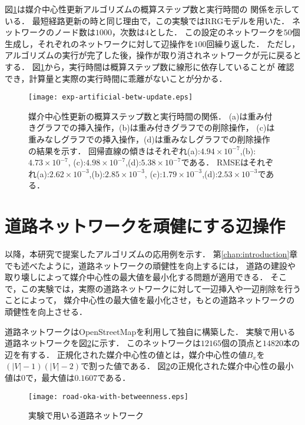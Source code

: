 図\ref{fig:exp-artificial-betw-update}は媒介中心性更新アルゴリズムの概算ステップ数と実行時間の
関係を示している．
最短経路更新の時と同じ理由で，この実験ではRRGモデルを用いた．
ネットワークのノード数は$1000$，次数は$4$とした．
この設定のネットワークを$50$個生成し，それぞれのネットワークに対して辺操作を$100$回繰り返した．
ただし，アルゴリズムの実行が完了した後，操作が取り消されネットワークが元に戻るとする．
図\ref{fig:exp-artificial-betw-update}から，実行時間は概算ステップ数に線形に依存していることが
確認でき，計算量と実際の実行時間に乖離がないことが分かる．

\begin{figure}
  \centering
  \texttt{[image: exp-artificial-betw-update.eps]}
  \caption{
    媒介中心性更新の概算ステップ数と実行時間の関係．
    (a)は重み付きグラフでの挿入操作，(b)は重み付きグラフでの削除操作，
    (c)は重みなしグラフでの挿入操作，(d)は重みなしグラフでの削除操作の結果を示す．
    回帰直線の傾きはそれぞれ(a):$4.94\times10^{-7}$,(b):$4.73\times10^{-7}$,
    (c):$4.98\times10^{-7}$,(d):$5.38\times10^{-7}$である．
    RMSEはそれぞれ(a):$2.62\times10^{-3}$,(b):$2.85\times10^{-3}$,
    (c):$1.79\times10^{-3}$,(d):$2.53\times10^{-3}$である．
  }
  \label{fig:exp-artificial-betw-update}
\end{figure}

\section{道路ネットワークを頑健にする辺操作}

以降，本研究で提案したアルゴリズムの応用例を示す．
第\ref{chap:introduction}章でも述べたように，道路ネットワークの頑健性を向上するには，
道路の建設や取り壊しによって媒介中心性の最大値を最小化する問題が適用できる．
そこで，この実験では，実際の道路ネットワークに対して一辺挿入や一辺削除を行うことによって，
媒介中心性の最大値を最小化させ，もとの道路ネットワークの頑健性を向上させる．

道路ネットワークはOpenStreetMap\cite{OpenStreetMap}を利用して独自に構築した．
実験で用いる道路ネットワークを図\ref{fig:road-okayama}に示す．
このネットワークは$12165$個の頂点と$14820$本の辺を有する．
正規化された媒介中心性の値とは，媒介中心性の値$B_x$を$(|V|-1)(|V|-2)$で割った値である．
図\ref{fig:road-okayama}の正規化された媒介中心性の最小値は$0$で，最大値は$0.1607$である．

\begin{figure}[tb]
  \centering
  \texttt{[image: road-oka-with-betweenness.eps]}
  \caption{
    実験で用いる道路ネットワーク
  }
  \label{fig:road-okayama}
\end{figure}

